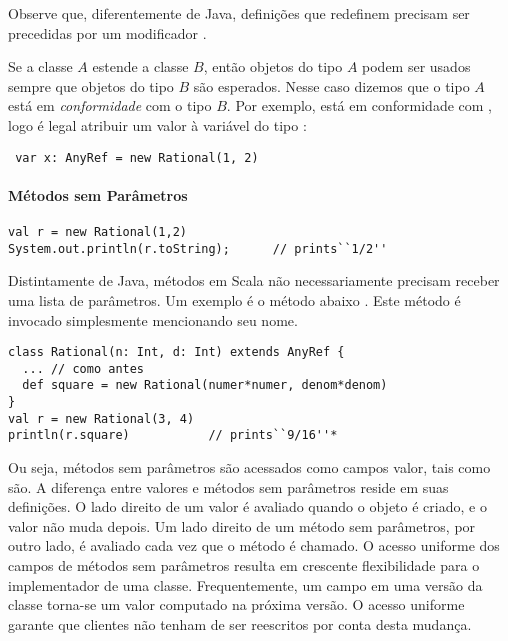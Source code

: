 Observe que, diferentemente de Java, defini\c{c}\~{o}es que redefinem precisam
ser precedidas por um modificador .  

Se a classe $A$ estende a classe $B$, ent\~{a}o objetos do tipo $A$ podem ser
usados sempre que objetos do tipo $B$ s\~{a}o esperados. Nesse caso dizemos que o 
tipo $A$ est\'{a} em {\em conformidade} com o tipo $B$. Por exemplo, 
est\'{a} em conformidade com , logo \'{e} legal atribuir um valor 
à vari\'{a}vel do tipo :
 
\begin{lstlisting}
 var x: AnyRef = new Rational(1, 2)
\end{lstlisting}

\paragraph{M\'{e}todos sem Par\^{a}metros}

\begin{lstlisting}
val r = new Rational(1,2)
System.out.println(r.toString);      // prints``1/2''
\end{lstlisting}

Distintamente de Java, m\'{e}todos em Scala n\~{a}o necessariamente precisam 
receber uma lista de par\^{a}metros. Um exemplo \'{e} o m\'{e}todo abaixo .
Este m\'{e}todo \'{e} invocado simplesmente mencionando seu nome. 
\begin{lstlisting}
class Rational(n: Int, d: Int) extends AnyRef {
  ... // como antes
  def square = new Rational(numer*numer, denom*denom)
}
val r = new Rational(3, 4)
println(r.square)           // prints``9/16''*
\end{lstlisting}

Ou seja, m\'{e}todos sem par\^{a}metros s\~{a}o acessados como campos valor, tais como 
 s\~{a}o. A diferen\c{c}a entre valores e m\'{e}todos sem par\^{a}metros 
reside em suas defini\c{c}\~{o}es. O lado direito de um valor \'{e} avaliado quando o 
objeto \'{e} criado, e o valor n\~{a}o muda depois. Um lado direito de um m\'{e}todo sem
par\^{a}metros, por outro lado, \'{e} avaliado cada vez que o m\'{e}todo \'{e} chamado. O 
acesso uniforme dos campos de m\'{e}todos sem par\^{a}metros resulta em crescente
flexibilidade para o implementador de uma classe. Frequentemente, um campo
em uma vers\~{a}o da classe torna-se um valor computado na pr\'{o}xima vers\~{a}o. 
O acesso uniforme garante que clientes n\~{a}o tenham de ser reescritos 
por conta desta mudan\c{c}a.

